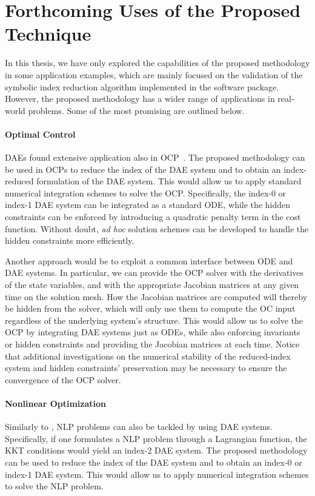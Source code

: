 \section{Forthcoming Uses of the Proposed Technique}

In this thesis, we have only explored the capabilities of the proposed methodology in some application examples, which are mainly focused on the validation of the symbolic index reduction algorithm implemented in the \Indigo{} software package. However, the proposed methodology has a wider range of applications in real-world problems. Some of the most promising are outlined below.

\paragraph{Optimal Control}

\acp{DAE} found extensive application also in \ac{OCP}~\cite{gerdts2012optimal, gerdts2003optimal, gerdts2005gradient}. The proposed methodology can be used in \acp{OCP} to reduce the index of the \ac{DAE} system and to obtain an index-reduced formulation of the \ac{DAE} system. This would allow us to apply standard numerical integration schemes to solve the \ac{OCP}. Specifically, the index-0 or index-1 \ac{DAE} system can be integrated as a standard \ac{ODE}, while the hidden constraints can be enforced by introducing a quadratic penalty term in the cost function. Without doubt, \emph{ad hoc} solution schemes can be developed to handle the hidden constraints more efficiently.

Another approach would be to exploit a common interface between \ac{ODE} and \ac{DAE} systems. In particular, we can provide the \ac{OCP} solver with the derivatives of the state variables, and with the appropriate Jacobian matrices at any given time on the solution mesh. How the Jacobian matrices are computed will thereby be hidden from the solver, which will only use them to compute the \ac{OC} input regardless of the underlying system's structure. This would allow us to solve the \ac{OCP} by integrating \ac{DAE} systems just as \acp{ODE}, while also enforcing invariants or hidden constraints and providing the Jacobian matrices at each time. Notice that additional investigations on the numerical stability of the reduced-index system and hidden constraints' preservation may be necessary to ensure the convergence of the \ac{OCP} solver.

\paragraph{Nonlinear Optimization}

Similarly to \citet{shmoylova2013simplification}, \ac{NLP} problems can also be tackled by using \ac{DAE} systems. Specifically, if one formulates a \ac{NLP} problem through a Lagrangian function, the \ac{KKT} conditions would yield an index-2 \ac{DAE} system. The proposed methodology can be used to reduce the index of the \ac{DAE} system and to obtain an index-0 or index-1 \ac{DAE} system. This would allow us to apply numerical integration schemes to solve the \ac{NLP} problem.
